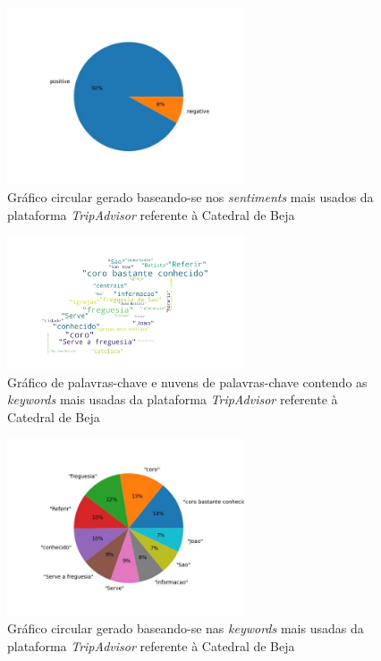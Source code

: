     \begin{figure}[!htb]
    \centering
    \includegraphics[width=7cm]{figuras/TripAdvisor/Activities/place8_sentiments.jpeg}
    \caption{Gráfico circular gerado baseando-se nos \textit{sentiments} mais usados da plataforma \textit{TripAdvisor} referente à Catedral de Beja}
    \label{fig:exemplofig}
    \end{figure}
    
    \begin{figure}[!htb]
    \centering
    \includegraphics[width=7cm]{figuras/TripAdvisor/Activities/place8_keywordcloud.jpeg}
    \caption{Gráfico de palavras-chave e nuvens de palavras-chave contendo as \textit{keywords} mais usadas da plataforma \textit{TripAdvisor} referente à Catedral de Beja}
    \label{fig:exemplofig}
    \end{figure}
    
    \begin{figure}[!htb]
    \centering
    \includegraphics[width=7cm]{figuras/TripAdvisor/Activities/place8_keywords.jpeg}
    \caption{Gráfico circular gerado baseando-se nas \textit{keywords} mais usadas da plataforma \textit{TripAdvisor} referente à Catedral de Beja}
    \label{fig:exemplofig}
    \end{figure}
    
